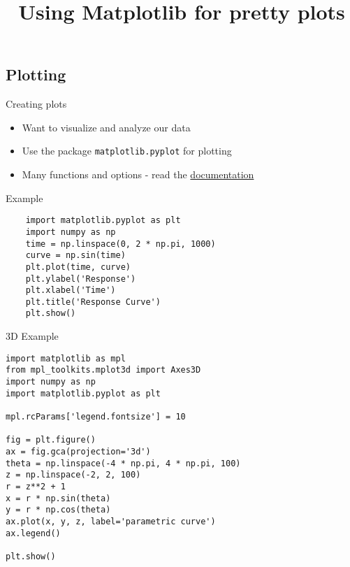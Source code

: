 \documentclass[11pt,professionalfonts]{beamer}
\title[Plotting]{\large \textbf{Using Matplotlib for pretty plots}}
\author{\vspace*{-0.3cm}}
\institute{
  \footnotesize
  {\normalsize\bf{Shankar Kulumani}}\\
  \vspace*{0.2cm}
    \textbf{Flight Dynamics \& Control Lab}\\ \vspace*{0.5cm}
  \begin{figure} %
        \texttt{[image: figures/gw\_txh\_2cs\_pos.pdf]}
    \end{figure}
}
\date{}
\begin{document}

\setcounter{framenumber}{-1}
\begin{frame} %
  \titlepage
\end{frame}   %

\section*{}
\subsection*{Plotting}  
\begin{frame}{Creating plots}
    \begin{itemize}
        \item Want to visualize and analyze our data
        \item Use the package \texttt{matplotlib.pyplot} for plotting
        \item Many functions and options - read the \href{https://matplotlib.org/users/pyplot_tutorial.html}{documentation}
    \end{itemize}
\end{frame}

\begin{frame}[fragile]{Example}
    \begin{verbatim}
    import matplotlib.pyplot as plt
    import numpy as np
    time = np.linspace(0, 2 * np.pi, 1000)
    curve = np.sin(time)
    plt.plot(time, curve)
    plt.ylabel('Response')
    plt.xlabel('Time')
    plt.title('Response Curve')
    plt.show()
\end{verbatim}
\end{frame}


\begin{frame}[fragile]{3D Example}
    \footnotesize
\begin{verbatim}
import matplotlib as mpl
from mpl_toolkits.mplot3d import Axes3D
import numpy as np
import matplotlib.pyplot as plt

mpl.rcParams['legend.fontsize'] = 10

fig = plt.figure()
ax = fig.gca(projection='3d')
theta = np.linspace(-4 * np.pi, 4 * np.pi, 100)
z = np.linspace(-2, 2, 100)
r = z**2 + 1
x = r * np.sin(theta)
y = r * np.cos(theta)
ax.plot(x, y, z, label='parametric curve')
ax.legend()

plt.show()
\end{verbatim}
\end{frame}
\end{document}
